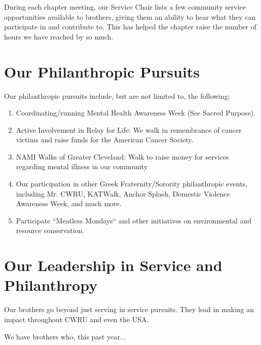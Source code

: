       During each chapter meeting, our Service Chair lists a few community service opportunities available to brothers, giving them an ability to hear what they can participate in and contribute to. This has helped the chapter raise the number of hours we have reached by so much. 
      
    \section*{Our Philanthropic Pursuits}
      Our philanthropic pursuits include, but are not limited to, the following:
      
      \begin{enumerate}
      	\item Coordinating/running Mental Health Awareness Week (See Sacred Purpose).
      	
      	\item Active Involvement in Relay for Life: We walk in remembrance of cancer victims and raise funds for the American Cancer Society.
      	
      	\item NAMI Walks of Greater Cleveland: Walk to raise money for services regarding mental illness in our community
      	
      	\item Our participation in other Greek Fraternity/Sorority philanthropic events, including Mr. CWRU, KATWalk, Anchor Splash, Domestic Violence Awareness Week, and much more.
      	
      	\item Participate ``Meatless Mondays`` and other initiatives on environmental and resource conservation.
      	
      \end{enumerate}
      
    \section*{Our Leadership in Service and Philanthropy}
      Our brothers go beyond just serving in service pursuits. They lead in making an impact throughout CWRU and even the USA.
      
      We have brothers who, this past year...
      
